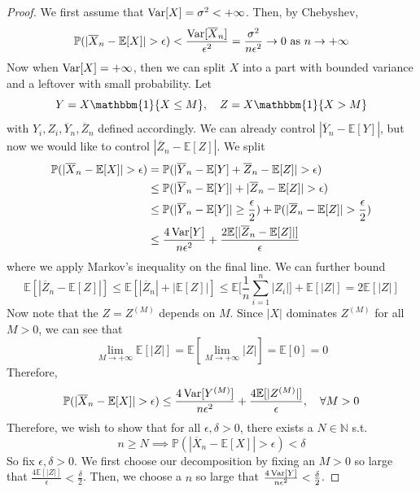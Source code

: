   \begin{proof}
		We first assume that $\operatorname{Var}[X] = \sigma^2 < +\infty$. Then, by Chebyshev, 
		\begin{equation}
			\mathbb{P}(|\overline{X}_n - \mathbb{E}[X]| > \epsilon) < \frac{\operatorname{Var}[\overline{X}_n]}{\epsilon^2} = \frac{\sigma^2}{n \epsilon^2} \to 0 \text{ as } n \to +\infty
		\end{equation} 
		Now when $\operatorname{Var}[X] = +\infty$, then we can split $X$ into a part with bounded variance and a leftover with small probability. Let 
		\begin{equation}
			Y = X \mathbbm{1}\{X \leq M\}, \quad Z = X \mathbbm{1}\{X > M\}
		\end{equation}
		with $Y_i, Z_i, \overline{Y}_n, \overline{Z}_n$ defined accordingly. We can already control $|\overline{Y}_n - \mathbb{E}[Y]|$, but now we would like to control $|\overline{Z}_n - \mathbb{E}[Z]|$. We split
		\begin{align}
			\mathbb{P}(|\overline{X}_n - \mathbb{E}[X]| > \epsilon) 
					& = \mathbb{P}(|\overline{Y}_n - \mathbb{E}[Y] + \overline{Z}_n - \mathbb{E}[Z]| > \epsilon) \\ 
					& \leq \mathbb{P}(|\overline{Y}_n - \mathbb{E}[Y]| + |\overline{Z}_n - \mathbb{E}[Z]| > \epsilon) \\  
					& \leq \mathbb{P}(|\overline{Y}_n - \mathbb{E}[Y]| \geq \frac{\epsilon}{2}) + \mathbb{P}(|\overline{Z}_n - \mathbb{E}[Z]| > \frac{\epsilon}{2}) \\ 
					& \leq \frac{4 \operatorname{Var}[Y]}{n \epsilon^2} +\frac{2 \mathbb{E}[|\overline{Z}_n - \mathbb{E}[Z]|]}{\epsilon}
		\end{align}
		where we apply Markov's inequality on the final line. We can further bound 
		\begin{equation}
			\mathbb{E}[|\overline{Z}_n - \mathbb{E}[Z]|] \leq \mathbb{E}[|\overline{Z}_n| + |\mathbb{E}[Z]|] \leq \mathbb{E} \bigg[ \frac{1}{n} \sum_{i=1}^n |Z_i|\bigg] + \mathbb{E}[|Z|] = 2 \mathbb{E}[|Z|]
		\end{equation}
		Now note that the $Z = Z^{(M)}$ depends on $M$. Since $|X|$ dominates $Z^{(M)}$ for all $M > 0$, we can see that 
		\begin{equation}
			\lim_{M \to +\infty} \mathbb{E}[|Z|] = \mathbb{E}[\lim_{M \to +\infty} |Z|] = \mathbb{E}[0] = 0
		\end{equation}
		Therefore, 
		\begin{equation}
			\mathbb{P}(|\overline{X}_n - \mathbb{E}[X]| > \epsilon) \leq \frac{4 \operatorname{Var}[Y^{(M)}]}{n \epsilon^2} + \frac{4 \mathbb{E}[|Z^{(M)}|]}{\epsilon}, \quad \forall M > 0
		\end{equation}
		Therefore, we wish to show that for all $\epsilon, \delta > 0$, there exists a $N \in \mathbb{N}$ s.t. 
		\begin{equation}
			n \geq N \implies \mathbb{P}(|\overline{X}_n - \mathbb{E}[X]| > \epsilon) < \delta
		\end{equation}
		So fix $\epsilon, \delta > 0$. We first choose our decomposition by fixing an $M > 0$ so large that $\frac{4\mathbb{E}[|Z|]}{\epsilon} < \frac{\delta}{2}$. Then, we choose a $n$ so large that $\frac{4 \operatorname{Var}[Y]}{n \epsilon^2} < \frac{\delta}{2}$. 
  \end{proof}

